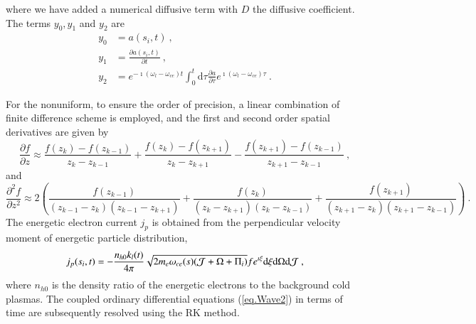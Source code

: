 where we have added a numerical diffusive term with $D$ the diffusive coefficient. The terms $y_0,y_1$ and $y_2$ are
\begin{equation}
    \begin{aligned}
        y_0 &= a(s_i,t)~,
        \\
        y_1 &= \frac{\partial a(s_i,t)}{\partial t}~,
        \\
        y_2 &= e^{-\imath(\omega_l-\omega_{ce})t} \int_0^t\mathrm{d}\tau \frac{\partial a}{\partial \tau} e^{\imath(\omega_l-\omega_{ce})\tau}~.
    \end{aligned}
\end{equation}

For the nonuniform, to ensure the order of precision, a linear combination of finite difference scheme is employed, and the first and second order spatial derivatives are given by 
\begin{equation}
    \frac{\partial f}{\partial z} \approx \frac{f(z_k) - f(z_{k-1})}{z_k-z_{k-1}} + \frac{f(z_k) - f(z_{k+1})}{z_k - z_{k+1}} - \frac{f(z_{k+1}) - f(z_{k-1})}{z_{k+1} - z_{k-1}}~,
\end{equation}
and
\begin{equation}
    \frac{\partial^2 f}{\partial z^2} \approx 2 \left(\frac{f(z_{k-1})}{(z_{k-1}-z_{k})(z_{k-1}-z_{k+1})}+\frac{f(z_{k})}{(z_k-z_{k+1})(z_k-z_{k-1})}+\frac{f(z_{k+1})}{(z_{k+1}-z_{k})(z_{k+1}-z_{k-1})}\right)~.
\end{equation}
The energetic electron current $j_p$ is obtained from the perpendicular velocity moment of energetic particle distribution,
\begin{equation}
    j_p(s_i,t) = - \frac{n_{h0}k_l(t)}{4\pi}\iiint \sqrt{2m_e\omega_{ce}(s)(\mathcal{J}+\Omega+\Pi_i)}f e^{\imath \xi} \rm d \xi \rm d \Omega \rm d \mathcal{J}~,
\end{equation}
where $n_{h0}$ is the density ratio of the energetic electrons to the background cold plasmas.
The coupled ordinary differential equations (\ref{eq.Wave2}) in terms of time are subsequently resolved using the RK method.

